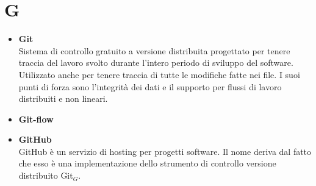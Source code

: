 \chapter{G} \label{G}
\begin{itemize}
	\item \textbf{Git}\\
	Sistema di controllo gratuito a versione distribuita progettato per tenere traccia del lavoro svolto durante l'intero periodo di sviluppo del software.
	Utilizzato anche per tenere traccia di tutte le modifiche fatte nei file.
	I suoi punti di forza sono l'integrità dei dati e il supporto per flussi di lavoro distribuiti e non lineari.

	\item \textbf{Git-flow}\\
	
	\item \textbf{GitHub} \\
	GitHub è un servizio di hosting per progetti software. Il nome deriva dal fatto che esso è una implementazione dello strumento di controllo versione distribuito Git$_G$.
	\end{itemize}
